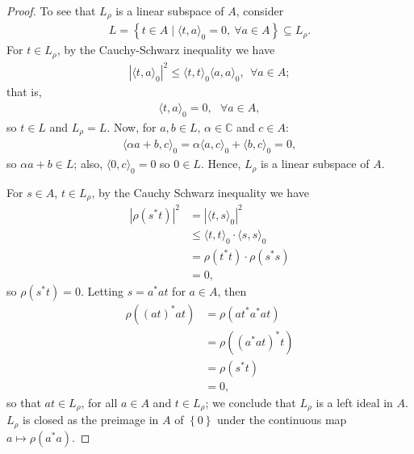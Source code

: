 \documentclass[11pt,a4paper]{report}
\theoremstyle{plain}
\theoremstyle{definition}
\newcommand{\1}{\mathbbm{1}}
\begin{document}
\begin{proof}
	To see that $L_\rho$ is a linear subspace of $A$, consider 
	\begin{align*}
		L= \left\{t \in A  \mid \langle t,a \rangle _0 = 0, ~\forall a \in A \right\} \subseteq L_\rho.
	\end{align*}
	For $t \in L_\rho$, by the Cauchy-Schwarz inequality we have 
	\begin{align*} 
		|\langle t,a \rangle_0|^2 \leq \langle t,t \rangle_0 \langle a,a\rangle_0,~~ \forall a \in A;
	\end{align*}
	that is,
	\begin{align*}
		\langle t,a \rangle _0 = 0, ~~~ \forall a \in A,
	\end{align*}
	so $t\in L$ and $L_\rho =L$.
	Now, for $a,b \in L$, $\alpha \in \mathbb{C}$ and $c \in A$:
	\begin{align*}
		\langle \alpha a + b, c \rangle _0 = \alpha \langle a,c \rangle _0 + 
						\langle b,c\rangle _0 = 0,
	\end{align*}
	so $\alpha a +b \in L$; also, $\langle 0,c\rangle _0 = 0$ so $0 \in L$. 
	Hence, $L_\rho  $ is a linear subspace of $A$.
	
	For $s \in A$, $t\in L_\rho$, by the Cauchy Schwarz inequality we have 
	\begin{align*}
		|\rho (s^\ast t) |^2 
		&= 		|\langle t,s\rangle_0 |^2 									\\
		&\leq 	\langle t,t\rangle_0 \cdot \langle s,s\rangle_0  			\\
		&= 		\rho (t^\ast t) \cdot \rho (s^\ast s)						\\
		&=		0,
	\end{align*}
	so $\rho (s^\ast t) = 0$. Letting $s = a^\ast a t$ for $a \in A$, then
	\begin{align*}
		\rho ((at)^\ast at) 
		&= 		\rho (at^\ast a^\ast at) 									\\
		&= 		\rho ((a^\ast at)^\ast t) 									\\
		&= 		\rho (s^\ast t) 											\\
		&=		0,
	\end{align*}
	so that $at \in L_\rho$, for all $a \in A$ and $t \in L_\rho$; 
	we conclude that $L_\rho$ is a left ideal in $A$. $L_\rho$ is closed as the preimage in $A$ of $
	\left\{0\right\}$ under the continuous map $a \mapsto \rho (a^\ast a)$. 
	

\end{proof}
\end{document}
